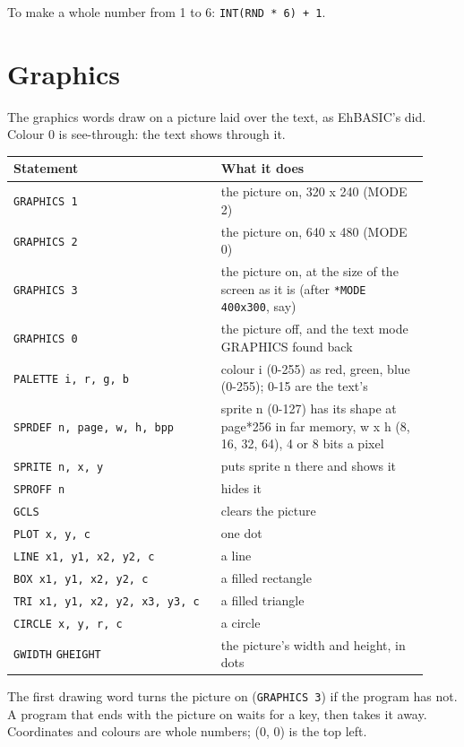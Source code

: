 To make a whole number from 1 to 6: \texttt{INT(RND * 6) + 1}.

\section{Graphics}

The graphics words draw on a picture laid over the text, as EhBASIC's
did. Colour 0 is see-through: the text shows through it.

\begin{center}
\small
\begin{tabular}{@{}>{\raggedright\arraybackslash}p{0.46\linewidth} >{\raggedright\arraybackslash}p{0.46\linewidth}@{}}
\toprule
\textbf{Statement} & \textbf{What it does} \\
\midrule
\texttt{GRAPHICS 1} & the picture on, 320 x 240 (MODE 2) \\
\texttt{GRAPHICS 2} & the picture on, 640 x 480 (MODE 0) \\
\texttt{GRAPHICS 3} & the picture on, at the size of the screen as it is (after \texttt{*MODE 400x300}, say) \\
\texttt{GRAPHICS 0} & the picture off, and the text mode GRAPHICS found back \\
\texttt{PALETTE i, r, g, b} & colour i (0-255) as red, green, blue (0-255); 0-15 are the text's \\
\texttt{SPRDEF n, page, w, h, bpp} & sprite n (0-127) has its shape at page*256 in far memory, w x h (8, 16, 32, 64), 4 or 8 bits a pixel \\
\texttt{SPRITE n, x, y} & puts sprite n there and shows it \\
\texttt{SPROFF n} & hides it \\
\verb|GCLS| & clears the picture \\
\texttt{PLOT x, y, c} & one dot \\
\texttt{LINE x1, y1, x2, y2, c} & a line \\
\texttt{BOX x1, y1, x2, y2, c} & a filled rectangle \\
\texttt{TRI x1, y1, x2, y2, x3, y3, c} & a filled triangle \\
\texttt{CIRCLE x, y, r, c} & a circle \\
\verb|GWIDTH| \verb|GHEIGHT| & the picture's width and height, in dots \\
\bottomrule
\end{tabular}
\end{center}

The first drawing word turns the picture on (\texttt{GRAPHICS 3}) if the
program has not. A program that ends with the picture on waits for a
key, then takes it away. Coordinates and colours are whole numbers;
(0, 0) is the top left.

